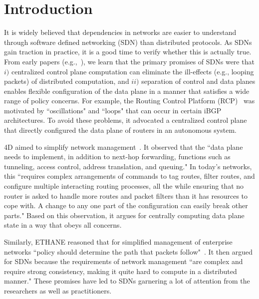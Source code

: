 \section{Introduction}
\label{sec:intro}

It is widely believed that dependencies in networks are easier to understand through software defined networking (SDN) than distributed protocols. As SDNs gain traction in practice, it is a good time to verify whether this is actually true.
From early papers (e.g.,~\cite{rcp-case,rcp,4d,ethane}), we learn that the primary promises of SDNs were that $i)$  centralized control plane computation can eliminate the ill-effects (e.g., looping packets) of distributed computation, and $ii)$ separation of control and data planes enables flexible configuration of the data plane in a manner that satisfies a wide range of policy concerns.
For example, the Routing Control Platform (RCP)~\cite{rcp-case,rcp} was motivated by ``oscillations" and ``loops" that can occur in certain iBGP architectures. To avoid these problems, it advocated a centralized control plane that directly configured the data plane of routers in an autonomous system.

4D aimed to simplify network management~\cite{4d}. It observed that the ``data plane needs to implement, in addition to next-hop forwarding, functions such as tunneling, access control, address translation, and queuing." In today's networks, this ``requires complex arrangements of commands to tag routes, filter routes, and configure multiple interacting routing processes, all the while ensuring that no router is asked to handle more routes and packet filters than it has resources to cope with. A change to any one part of the configuration can easily break other parts." Based on this observation, it argues for centrally computing data plane state in a way that obeys all concerns.

Similarly, ETHANE reasoned that for simplified management of enterprise networks ``policy should determine the path that packets follow"~\cite{ethane}. It then argued for SDNs because the requirements of network management ``are complex and require strong consistency, making it quite hard to compute in a distributed manner." These promises have led to SDNs garnering a lot of attention from the researchers as well as practitioners.


